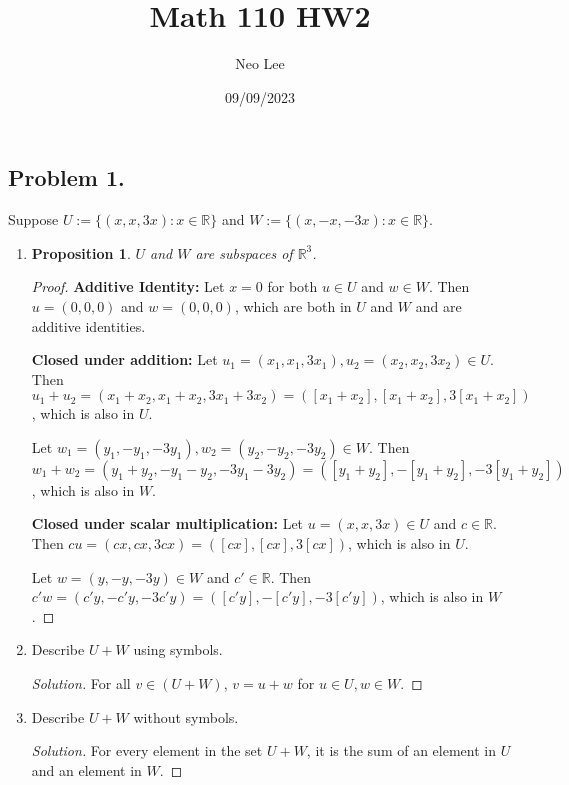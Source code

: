 \documentclass{article}
\title{Math 110 HW2}
\author{Neo Lee}
\date{09/09/2023}
\newtheorem{proposition}[thm]{Proposition}
\begin{document}
 

\maketitle 

\subsection*{Problem 1.}
Suppose $U:=\{(x,x,3x):x\in\mathbb{R}\}$ and $W:=\{(x,-x,-3x):x\in\mathbb{R}\}$. 
\begin{enumerate}[label=(\alph*)]
    \item \begin{proposition}
        $U$ and $W$ are subspaces of $\mathbb{R}^3$.
    \end{proposition}
    \begin{proof}
        
        \textbf{Additive Identity:}
        Let $x = 0$ for both $u\in U$ and $w\in W$. Then $u = (0,0,0)$ and $w = (0,0,0)$, which 
        are both in $U$ and $W$ and are additive identities.

        \textbf{Closed under addition:}
        Let $u_1 = (x_1, x_1, 3x_1), u_2 = (x_2, x_2, 3x_2)\in U$. Then $u_1+u_2 = (x_1+x_2, 
        x_1+x_2, 3x_1+3x_2) = ([x_1+x_2], [x_1+x_2], 3[x_1+x_2])$, which is also in $U$.

        Let $w_1 = (y_1, -y_1, -3y_1), w_2 = (y_2, -y_2, -3y_2)\in W$. Then $w_1+w_2 = (y_1+y_2, 
        -y_1-y_2, -3y_1-3y_2) = ([y_1+y_2], -[y_1+y_2], -3[y_1+y_2])$, which is also in $W$.

        \textbf{Closed under scalar multiplication:}
        Let $u = (x, x, 3x)\in U$ and $c\in\mathbb{R}$. Then $cu = (cx, cx, 3cx) = ([cx], [cx], 
        3[cx])$, which is also in $U$. 

        Let $w = (y, -y, -3y)\in W$ and $c'\in\mathbb{R}$. Then $c'w = (c'y, -c'y, -3c'y) = ([c'y], 
        -[c'y], -3[c'y])$, which is also in $W$.
    \end{proof}
    \item Describe $U+W$ using symbols.
    \begin{proof}[Solution]
        For all $v \in (U+W)$, $v = u + w$ for $u\in U, w\in W$.
    \end{proof}
    \item Describe $U+ W$ without symbols.
    \begin{proof}[Solution]
        For every element in the set $U+W$, it is the sum of an element in $U$ and an element in $W$.
    \end{proof}
\end{enumerate}
\end{document}
